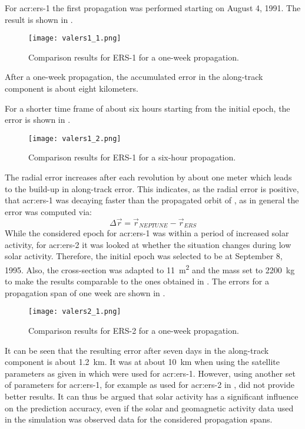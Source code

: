For \acrshort{acr:ers}-1 the first propagation was performed starting on August 4, 1991. The result is shown in .
\begin{figure}[!h]
 \centering
 \texttt{[image: valers1\_1.png]}
 \caption{Comparison results for ERS-1 for a one-week propagation.\label{fig:val-ers1-01}}
\end{figure}
After a one-week propagation, the accumulated error in the along-track component is about eight kilometers. 

For a shorter time frame of about six hours starting from the initial epoch, the error is shown in .
\begin{figure}[!h]
 \centering
 \texttt{[image: valers1\_2.png]}
 \caption{Comparison results for ERS-1 for a six-hour propagation.\label{fig:val-ers1-02}}
\end{figure}
The radial error increases after each revolution by about one meter which leads to the build-up in along-track error. This indicates, as the radial error is positive, that \acrshort{acr:ers}-1 was decaying faster than the propagated orbit of \neptune{}, as in general the error was computed via:
\begin{equation}
  \Delta \vec{r} = \vec{r}_{NEPTUNE} - \vec{r}_{ERS}
\end{equation}
While the considered epoch for \acrshort{acr:ers}-1 was within a period of increased solar activity, for \acrshort{acr:ers}-2 it was looked at whether the situation changes during low solar activity. Therefore, the initial epoch was selected to be at September 8, 1995. Also, the cross-section was adapted to \SI{11}{\metre\squared} and the mass set to \SI{2200}{\kilogram} to make the results comparable to the ones obtained in \cite{vallado2007}. The errors for a propagation span of one week are shown 
in .
\begin{figure}[!h]
 \centering
 \texttt{[image: valers2\_1.png]}
 \caption{Comparison results for ERS-2 for a one-week propagation.\label{fig:val-ers2-01}}
\end{figure}
It can be seen that the resulting error after seven days in the along-track component is about \SI{1.2}{\kilo\metre}. It was at about \SI{10}{\kilo\metre} when using the satellite parameters as given in  which were used for \acrshort{acr:ers}-1. However, using another set of parameters for \acrshort{acr:ers}-1, for example as used for \acrshort{acr:ers}-2 in , did not provide better results. It can thus be argued that solar activity has a significant influence on the prediction accuracy, even if the solar and geomagnetic activity data used in the simulation was observed data for the considered 
propagation spans. 

